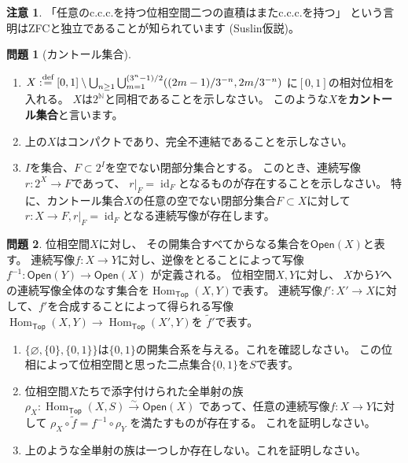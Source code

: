\documentclass[uplatex]{jsarticle}
\theoremstyle{definition}
\newtheorem{prob}[prob]{問題}
\newtheorem*{rem*}{注意}
\DeclareMathOperator{\Hom}{Hom}
\DeclareMathOperator{\id}{\mathrm{id}}
\renewcommand{\emptyset}{\varnothing}
\newcommand{\dfn}{:\overset{\mbox{{\scriptsize def}}}{=}}
\newcommand{\N}{\mathbb{N}}
\begin{document}
\begin{rem*}
  「任意のc.c.c.を持つ位相空間二つの直積はまたc.c.c.を持つ」
  という言明はZFCと独立であることが知られています (Suslin仮説)。
\end{rem*}



\begin{prob}[カントール集合]
  \
  \begin{enumerate}
    \item
    \(X\dfn [0,1]\setminus \bigcup_{n\geq 1}\bigcup_{m=1}^{(3^n-1)/2} ((2m-1)/3^{-n},2m/3^{-n})\)
    に\([0,1]\)の相対位相を入れる。
    \(X\)は\(2^{\N}\)と同相であることを示しなさい。
    このような\(X\)を\textbf{カントール集合}と言います。
    \item
    上の\(X\)はコンパクトであり、完全不連結であることを示しなさい。
    \item
    \(I\)を集合、\(F\subset 2^I\)を空でない閉部分集合とする。
    このとき、連続写像\(r:2^X \to F\)であって、
    \(r|_F = \id_F\)となるものが存在することを示しなさい。
    特に、カントール集合\(X\)の任意の空でない閉部分集合\(F\subset X\)に対して
    \(r:X\to F, r|_F = \id_F\)となる連続写像が存在します。
  \end{enumerate}
\end{prob}




\begin{prob}
  位相空間\(X\)に対し、
  その開集合すべてからなる集合を\(\mathsf{Open}(X)\)と表す。
  連続写像\(f:X\to Y\)に対し、逆像をとることによって写像
  \(f^{-1}: \mathsf{Open}(Y) \to \mathsf{Open}(X)\)
  が定義される。
  位相空間\(X,Y\)に対し、
  \(X\)から\(Y\)への連続写像全体のなす集合を\(\Hom_{\mathsf{Top}}(X,Y)\)で表す。
  連続写像\(f':X'\to X\)に対して、\(f'\)を合成することによって得られる写像
  \(\Hom_{\mathsf{Top}}(X,Y)\to \Hom_{\mathsf{Top}}(X',Y)\)を
  \(\tilde{f}'\)で表す。
  \begin{enumerate}
    \item
    \(\{\emptyset,\{0\},\{0,1\}\}\)は\(\{0,1\}\)の開集合系を与える。これを確認しなさい。
    この位相によって位相空間と思った二点集合\(\{0,1\}\)を\(S\)で表す。
    \item
    位相空間\(X\)たちで添字付けられた全単射の族
    \(\rho_X: \Hom_{\mathsf{Top}}(X,S) \xrightarrow{\sim} \mathsf{Open}(X)\)
    であって、任意の連続写像\(f:X\to Y\)に対して
    \(\rho_X \circ \tilde{f} = f^{-1}\circ \rho_Y\)
    を満たすものが存在する。
    これを証明しなさい。
    \item
    上のような全単射の族は一つしか存在しない。これを証明しなさい。
  \end{enumerate}
\end{prob}
\end{document}

